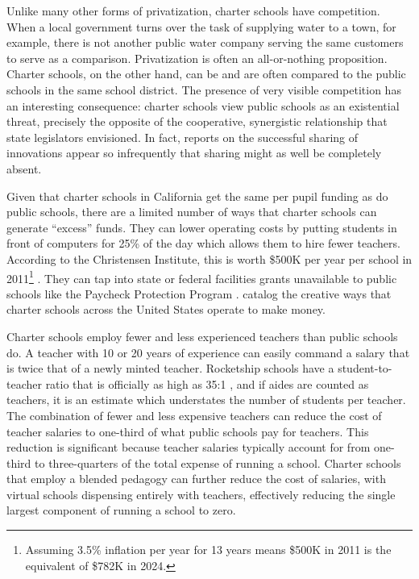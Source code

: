 Unlike many other forms of privatization, charter schools have competition. When a local government turns over the task of supplying water to a town, for example, there is not another public water company serving the same customers to serve as a comparison. Privatization is often an all-or-nothing proposition. Charter schools, on the other hand, can be and are often compared to the public schools in the same school district. \newpage\noindent%
The presence of very visible competition has an interesting consequence: charter schools view public schools as an existential threat, precisely the opposite of the cooperative, synergistic relationship that state legislators envisioned. In fact, reports on the successful sharing of innovations appear so infrequently that sharing might as well be completely absent. 

Given that charter schools in California get the same per pupil funding as do public schools, there are a limited number of ways that charter schools can generate ``excess'' funds. They can lower operating costs by putting students in front of computers for 25\% of the day which allows them to hire fewer teachers. According to the Christensen Institute, this is worth \$500K per year per school in 2011\footnote{Assuming 3.5\% inflation per year for 13 years means \$500K in 2011 is the equivalent of \$782K in 2024.} \parencite{ChristensenInstitute2011}. They can tap into state or federal facilities grants unavailable to public schools like the Paycheck Protection Program \parencite[18]{RSEA2020}. \textcite{Baker.Miron2015} catalog the creative ways that charter schools across the United States operate to make money.

Charter schools employ fewer and less experienced teachers than public schools do. A teacher with 10 or 20 years of experience can easily command a salary that is twice that of a newly minted teacher. Rocketship schools have a student-to-teacher ratio that is officially as high as 35:1 \parencite[44]{SCCOE2023}, and if aides are counted as teachers, it is an estimate which understates the number of students per teacher. The combination of fewer and less expensive teachers can reduce the cost of teacher salaries to one-third of what public schools pay for teachers. This reduction is significant because teacher salaries typically account for from one-third to three-quarters of the total expense of running a school. Charter schools that employ a blended pedagogy can further reduce the cost of salaries, with virtual schools dispensing entirely with teachers, effectively reducing the single largest component of running a school to zero.

